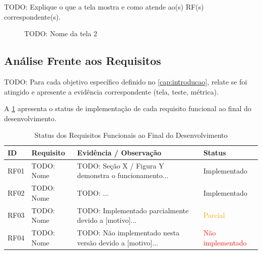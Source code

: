 TODO: Explique o que a tela mostra e como atende ao(s) RF(s) correspondente(s).

\begin{figure}[H]
  \caption{TODO: Nome da tela 2}
  \label{fig:tela-2}
  \centering
  \fbox{\rule{0pt}{5cm}\rule{0.85\textwidth}{0pt}} %
\end{figure}


\subsection{Análise Frente aos Requisitos}
\label{subsec:analise-requisitos}

TODO: Para cada objetivo específico definido no \cref{cap:introducao},
relate se foi atingido e apresente a evidência correspondente (tela,
teste, métrica).

A \cref{tab:resultados-rf} apresenta o status de implementação de cada
requisito funcional ao final do desenvolvimento.

\begin{table}[H]
  \caption{Status dos Requisitos Funcionais ao Final do Desenvolvimento}
  \label{tab:resultados-rf}
  \centering
  \begin{tabularx}{\textwidth}{llXl}
    \toprule
    \textbf{ID} & \textbf{Requisito} & \textbf{Evidência / Observação}
                & \textbf{Status} \\
    \midrule
    RF01 & TODO: Nome & TODO: Seção X / Figura Y demonstra o
           funcionamento...
         & \textcolor{green!50!black}{Implementado} \\
    RF02 & TODO: Nome & TODO: ...
         & \textcolor{green!50!black}{Implementado} \\
    RF03 & TODO: Nome & TODO: Implementado parcialmente devido a
           [motivo]...
         & \textcolor{orange}{Parcial} \\
    RF04 & TODO: Nome & TODO: Não implementado nesta versão devido
           a [motivo]...
         & \textcolor{red}{Não implementado} \\
    \bottomrule
  \end{tabularx}
\end{table}


